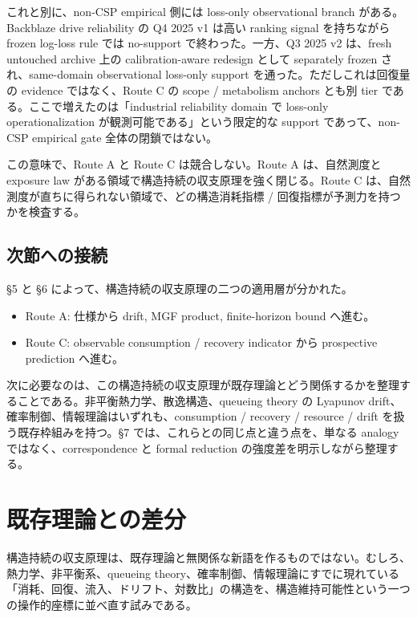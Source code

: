 \documentclass[12pt,a4paper]{article}
\begin{document}
これと別に、non-CSP empirical 側には loss-only observational branch がある。Backblaze drive reliability の Q4 2025 v1 は高い ranking signal を持ちながら frozen log-loss rule では no-support で終わった。一方、Q3 2025 v2 は、fresh untouched archive 上の calibration-aware redesign として separately frozen され、same-domain observational loss-only support を通った。ただしこれは回復量の evidence ではなく、Route C の scope / metabolism anchors とも別 tier である。ここで増えたのは「industrial reliability domain で loss-only operationalization が観測可能である」という限定的な support であって、non-CSP empirical gate 全体の閉鎖ではない。

この意味で、Route A と Route C は競合しない。Route A は、自然測度と exposure law がある領域で構造持続の収支原理を強く閉じる。Route C は、自然測度が直ちに得られない領域で、どの構造消耗指標 / 回復指標が予測力を持つかを検査する。

\subsection{次節への接続}\label{ux6b21ux7bc0ux3078ux306eux63a5ux7d9a-2}

§5 と §6 によって、構造持続の収支原理の二つの適用層が分かれた。

\begin{itemize}
\tightlist
\item
  Route A: 仕様から drift, MGF product, finite-horizon bound へ進む。
\item
  Route C: observable consumption / recovery indicator から prospective prediction へ進む。
\end{itemize}

次に必要なのは、この構造持続の収支原理が既存理論とどう関係するかを整理することである。非平衡熱力学、散逸構造、queueing theory の Lyapunov drift、確率制御、情報理論はいずれも、consumption / recovery / resource / drift を扱う既存枠組みを持つ。§7 では、これらとの同じ点と違う点を、単なる analogy ではなく、correspondence と formal reduction の強度差を明示しながら整理する。

\section{既存理論との差分}\label{ux65e2ux5b58ux7406ux8ad6ux3068ux306eux5deeux5206}

構造持続の収支原理は、既存理論と無関係な新語を作るものではない。むしろ、熱力学、非平衡系、queueing theory、確率制御、情報理論にすでに現れている「消耗、回復、流入、ドリフト、対数比」の構造を、構造維持可能性という一つの操作的座標に並べ直す試みである。
\end{document}

